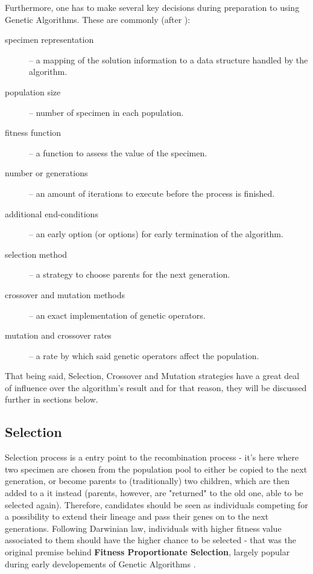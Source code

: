 Furthermore, one has to make several key decisions during preparation to using Genetic Algorithms. These are commonly (after \cite{kozagp}):
\begin{description}
    \item[specimen representation] -- a mapping of the solution information to a data structure handled by the algorithm.
    \item[population size] -- number of specimen in each population.
    \item[fitness function] -- a function to assess the value of the specimen.
    \item[number or generations] -- an amount of iterations to execute before the process is finished.
    \item[additional end-conditions] -- an early option (or options) for early termination of the algorithm.
    \item[selection method] -- a strategy to choose parents for the next generation.
    \item[crossover and mutation methods] -- an exact implementation of genetic operators.
    \item[mutation and crossover rates] -- a rate by which said genetic operators affect the population.
\end{description}

That being said, Selection, Crossover and Mutation strategies have a great deal of influence over the algorithm's result and for that reason, they will be discussed further in sections below.
\subsection{Selection}
Selection process is a entry point to the recombination process - it's here where two specimen are chosen from the population pool to either be copied to the next generation, or become parents to (traditionally) two children, which are then added to a it instead (parents, however, are "returned" to the old one, able to be selected again). Therefore, candidates should be seen as individuals competing for a possibility to extend their lineage and pass their genes on to the next generations. Following Darwinian law, individuals with higher fitness value associated to them should have the higher chance to be selected - that was the original premise behind \textbf{Fitness Proportionate Selection}, largely popular during early developements of Genetic Algorithms \cite{Luke2013Metaheuristics}.

